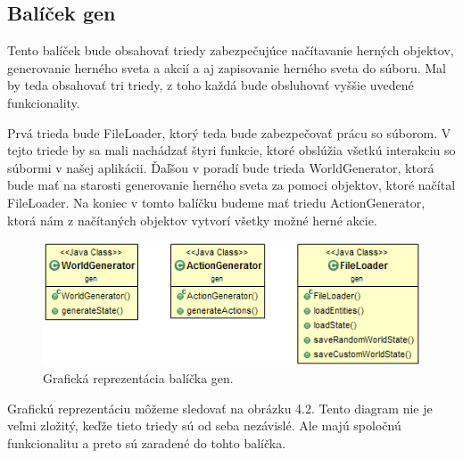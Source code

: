 \subsection{Balíček gen}
Tento balíček bude obsahovať triedy zabezpečujúce načítavanie herných objektov, generovanie herného sveta a akcií a aj zapisovanie herného sveta do súboru. Mal by teda obsahovať tri triedy, z toho každá bude obsluhovať vyššie uvedené funkcionality.\par
Prvá trieda bude FileLoader, ktorý teda bude zabezpečovať prácu so súborom. V tejto triede by sa mali nachádzať štyri funkcie, ktoré obslúžia všetkú interakciu so súbormi v našej aplikácii. Ďaľšou v poradí bude trieda WorldGenerator, ktorá bude mať na starosti generovanie herného sveta za pomoci objektov, ktoré načítal FileLoader. Na koniec v tomto balíčku budeme mať triedu ActionGenerator, ktorá nám z načítaných objektov vytvorí všetky možné herné akcie.
\begin{figure}[H] 
\begin{center}
\includegraphics[scale=0.9]{img/gen.png}
\caption{Grafická reprezentácia balíčka gen.}
\label{fig:ch42}
\end{center}
\end{figure}
Grafickú reprezentáciu môžeme sledovať na obrázku 4.2. Tento diagram nie je veľmi zložitý, keďže tieto triedy sú od seba nezávislé. Ale majú spoločnú funkcionalitu a preto sú zaradené do tohto balíčka.
